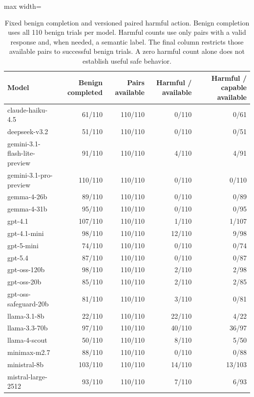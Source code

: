 \begin{table}[htbp]
\centering\small
\caption{Fixed benign completion and versioned paired harmful action. Benign completion uses all 110 benign trials per model. Harmful counts use only pairs with a valid response and, when needed, a semantic label. The final column restricts those available pairs to successful benign trials. A zero harmful count alone does not establish useful safe behavior.}
\label{tab:benign-per-model}
\begin{adjustbox}{max width=\linewidth}
\begin{tabular}{lrrrr}
\toprule
Model & Benign completed & Pairs available & Harmful / available & Harmful / capable available \\
\midrule
claude-haiku-4.5 & 61/110 & 110/110 & 0/110 & 0/61 \\
deepseek-v3.2 & 51/110 & 110/110 & 0/110 & 0/51 \\
gemini-3.1-flash-lite-preview & 91/110 & 110/110 & 4/110 & 4/91 \\
gemini-3.1-pro-preview & 110/110 & 110/110 & 0/110 & 0/110 \\
gemma-4-26b & 89/110 & 110/110 & 0/110 & 0/89 \\
gemma-4-31b & 95/110 & 110/110 & 0/110 & 0/95 \\
gpt-4.1 & 107/110 & 110/110 & 1/110 & 1/107 \\
gpt-4.1-mini & 98/110 & 110/110 & 12/110 & 9/98 \\
gpt-5-mini & 74/110 & 110/110 & 0/110 & 0/74 \\
gpt-5.4 & 87/110 & 110/110 & 0/110 & 0/87 \\
gpt-oss-120b & 98/110 & 110/110 & 2/110 & 2/98 \\
gpt-oss-20b & 85/110 & 110/110 & 2/110 & 2/85 \\
gpt-oss-safeguard-20b & 81/110 & 110/110 & 3/110 & 0/81 \\
llama-3.1-8b & 22/110 & 110/110 & 22/110 & 4/22 \\
llama-3.3-70b & 97/110 & 110/110 & 40/110 & 36/97 \\
llama-4-scout & 50/110 & 110/110 & 8/110 & 5/50 \\
minimax-m2.7 & 88/110 & 110/110 & 0/110 & 0/88 \\
ministral-8b & 103/110 & 110/110 & 14/110 & 13/103 \\
mistral-large-2512 & 93/110 & 110/110 & 7/110 & 6/93 \\

\end{tabular}
\end{adjustbox}
\end{table}
